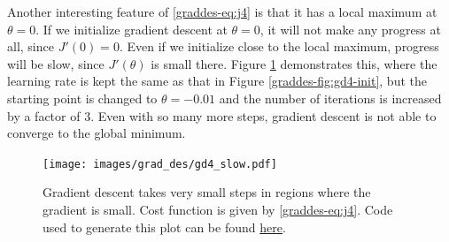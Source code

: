\documentclass{article}
\theoremstyle{definition}
\begin{document}
Another interesting feature of \eqref{graddes-eq:j4} is that it has a local maximum at $\theta=0$. If we initialize gradient descent at $\theta=0$, it will not make any progress at all, since $J'(0)=0$. Even if we initialize close to the local maximum, progress will be slow, since $J'(\theta)$ is small there. Figure \ref{graddes-fig:gd4-slow} demonstrates this, where the learning rate is kept the same as that in Figure \ref{graddes-fig:gd4-init}, but the starting point is changed to $\theta=-0.01$ and the number of iterations is increased by a factor of 3. Even with so many more steps, gradient descent is not able to converge to the global minimum.


\begin{figure}[ht]
\centering
\texttt{[image: images/grad\_des/gd4\_slow.pdf]}
\caption{Gradient descent takes very small steps in regions where the gradient is small. Cost function is given by \eqref{graddes-eq:j4}. Code used to generate this plot can be found \href{https://github.com/siavashaslanbeigi/ml_notes/blob/master/src/grad_des/basics.ipynb}{\color{blue} here}.}
\label{graddes-fig:gd4-slow}
\end{figure}


\end{document}
